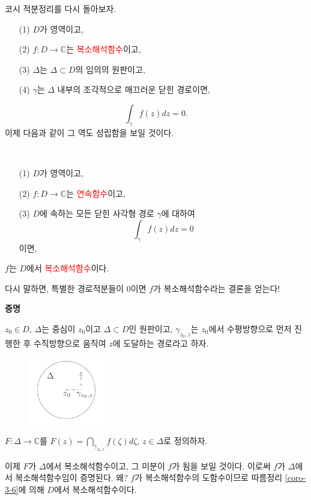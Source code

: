  코시 적분정리를 다시 돌아보자.
\begin{itemize}
\item[(1)] $D$가 영역이고, 
\item[(2)] $f:D\to \mathbb C$는 \textcolor{red}{복소해석함수}이고,
\item[(3)] $\Delta$는 $\Delta \subset D$의 임의의 원판이고,
\item[(4)] $\gamma$는 $\Delta$ 내부의 조각적으로 매끄러운 닫힌 경로이면,
\end{itemize}
\[
\int_\gamma f(z)dz = 0.
\]
이제 다음과 같이 그 역도 성립함을 보일 것이다.
\begin{salt_theorem}[모레라 정리] \label{thm-3-8}
\
\begin{itemize}
\item[(1)] $D$가 영역이고, 
\item[(2)] $f:D\to \mathbb C$는 \textcolor{red}{연속함수}이고,
\item[(3)] $D$에 속하는 모든 닫힌 사각형 경로 $\gamma$에 대하여
\[
\int_\gamma f(z)dz = 0
\]
이면,
\end{itemize}
$f$는 $D$에서 \textcolor{red}{복소해석함수}이다.
\end{salt_theorem}
다시 말하면, 특별한 경로적분들이 $0$이면
$f$가 복소해석함수라는 결론을 얻는다!

{\bf 증명}

$z_0\in D$, $\Delta$는 중심이 $z_0$이고 $\Delta \subset D$인 원판이고,
$\gamma_{z_0,z}$는 $z_0$에서 수평방향으로 먼저 진행한 후
수직방향으로 움직여 $z$에 도달하는 경로라고 하자.
\begin{figure}[h!]
\begin{center}
\includegraphics[width=0.3\textwidth]{./SaltChapter/fig-3-0-12}
\end{center}
\end{figure}

$F:\Delta \to \mathbb C$를 $F(z) = \dint_{\gamma_{z_0,z}} f(\zeta)d\zeta$, $z\in\Delta$로
정의하자.

이제 $F$가 $\Delta$에서 복소해석함수이고, 그 미분이 $f$가 됨을 보일 것이다.
이로써 $f$가 $\Delta$에서 복소해석함수임이 증명된다. 왜?
$f$가 복소해석함수의 도함수이므로 따름정리 \ref{coro-3-6}에 의해
$D$에서 복소해석함수이다.

